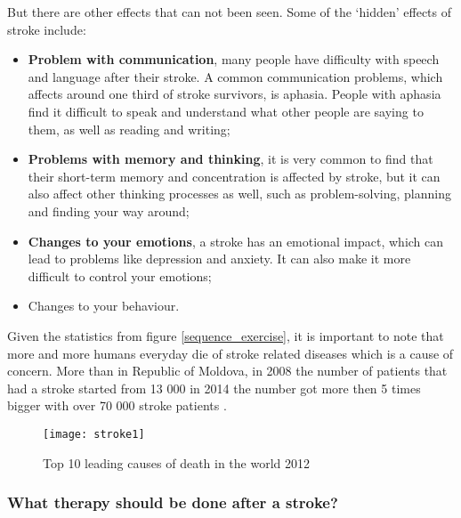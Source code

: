 But there are other effects that can not been seen. Some of the ‘hidden’ effects of stroke include:

\begin{itemize}
\item \textbf{Problem with communication},  many people have difficulty with speech and language after their stroke. A common communication problems, which affects around one third of stroke survivors, is aphasia. People with aphasia find it difficult to speak and understand what other people are saying to them, as well as reading and writing;

\item \textbf{Problems with memory and thinking}, it is very common to find that their short-term memory and concentration is affected by stroke, but it can also affect other thinking processes as well, such as problem-solving, planning and finding your way around;

\item \textbf{Changes to your emotions}, a stroke has an emotional impact, which can lead to problems like depression and anxiety. It can also make it more difficult to control your emotions;

\item Changes to your behaviour.
\end{itemize}

Given the statistics from \mbox{figure} \ref{sequence_exercise}, it is important to note that more and more humans everyday die of stroke related diseases which is a cause of concern. More than in Republic of Moldova, in 2008 the number of patients that had a stroke started from 13 000 in 2014 the number got more then 5 times bigger with over 70 000 stroke patients \cite{strokereferince}.
\begin{figure}[!h]
\centering
\texttt{[image: stroke1]}
\caption{Top 10 leading causes of death in the world 2012 \cite{strokeStatistic}}\label{stroke}
\end{figure}

\subsubsection{What therapy should be done after a stroke?}

